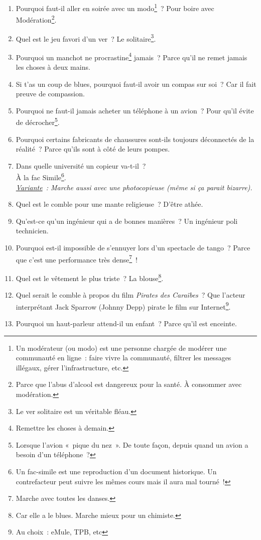 \documentclass[10pt,a5paper,fullpage]{book}
\begin{document}
\begin{enumerate}
		\item Pourquoi faut-il aller en soirée avec un modo\footnote{Un modérateur (ou modo) est une personne chargée de modérer une communauté en ligne~: faire vivre la communauté, filtrer les messages illégaux, gérer l'infrastructure, etc.}~? Pour  boire avec Modération\footnote{Parce que l'abus d'alcool est dangereux pour la santé. À consommer avec modération.}. 
		\item Quel est le jeu favori d’un ver~? Le solitaire\footnote{Le ver solitaire est un véritable fléau.}.
		\item Pourquoi un manchot ne procrastine\footnote{Remettre les choses à demain.} jamais~? Parce qu'il ne remet jamais les choses à deux mains. 
		\item Si t'as un coup de blues, pourquoi faut-il avoir un compas sur soi~? Car il fait preuve de compassion.
		\item Pourquoi ne faut-il jamais acheter un téléphone à un avion~? Pour qu’il évite de décrocher\footnote{Lorsque l’avion « pique du nez ». De toute façon, depuis quand un avion a besoin d'un téléphone~?}.
		\item Pourquoi certains fabricants de chaussures sont-ils toujours déconnectés de la réalité~? Parce qu’ils sont à côté de leurs pompes.
		\item Dans quelle université un copieur va-t-il~? \\À la fac Simile\footnote{Un fac-simile est une reproduction d’un document historique. Un contrefacteur peut suivre les mêmes cours mais il aura mal tourné~!}.\\\textit{\underline{Variante}~: Marche aussi avec une photocopieuse (même si ça parait bizarre).}
		\item Quel est le comble pour une mante religieuse~? D’être athée.
		\item Qu’est-ce qu’un ingénieur qui a de bonnes manières~? Un ingénieur poli technicien.
		\item Pourquoi est-il impossible de s’ennuyer lors d’un spectacle de tango~? Parce que c’est une performance très dense\footnote{Marche avec toutes les danses.}~!
		\item Quel est le vêtement le plus triste~? La blouse\footnote{Car elle a le blues. Marche mieux pour un chimiste.}.
		\item Quel serait le comble à propos du film \textit{Pirates des Caraïbes}~? Que l'acteur interprétant Jack Sparrow (Johnny Depp) pirate le film sur Internet\footnote{Au choix~: eMule, TPB, etc}. 
		\item Pourquoi un haut-parleur attend-il un enfant~? Parce qu’il est enceinte.

\end{enumerate}
\end{document}
